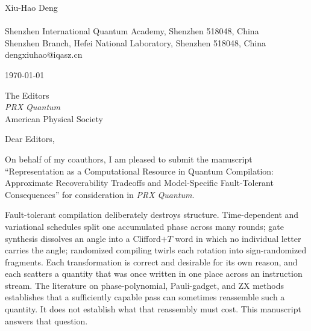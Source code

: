 \documentclass[11pt]{article}
\makeatletter
\newcommand{\AuthorName}{Xiu-Hao Deng}
\newcommand{\AuthorPosition}{}
\newcommand{\AuthorInstitutionA}{Shenzhen International Quantum Academy, Shenzhen 518048, China}
\newcommand{\AuthorInstitutionB}{Shenzhen Branch, Hefei National Laboratory, Shenzhen 518048, China}
\newcommand{\AuthorEmail}{dengxiuhao@iqasz.cn}
\newcommand{\LetterDate}{\today}
\newcommand{\PositionLine}{%
  \ifx\AuthorPosition\empty\else\AuthorPosition\\\fi}
\makeatother
\begin{document}
{\raggedright
\AuthorName\\
\PositionLine
\AuthorInstitutionA\\
\AuthorInstitutionB\\
\AuthorEmail\par}

\vspace{1.5\baselineskip}

\LetterDate

\vspace{1\baselineskip}

{\raggedright
The Editors\\
\textit{PRX Quantum}\\
American Physical Society\par}

\vspace{1.5\baselineskip}

Dear Editors,

On behalf of my coauthors, I am pleased to submit the manuscript
``Representation as a Computational Resource in Quantum Compilation:
Approximate Recoverability Tradeoffs and Model-Specific Fault-Tolerant
Consequences'' for consideration in \textit{PRX Quantum}.

Fault-tolerant compilation deliberately destroys structure. Time-dependent and
variational schedules split one accumulated phase across many rounds; gate
synthesis dissolves an angle into a Clifford$+T$ word in which no individual
letter carries the angle; randomized compiling twirls each rotation into
sign-randomized fragments. Each transformation is correct and desirable for its
own reason, and each scatters a quantity that was once written in one place
across an instruction stream. The literature on phase-polynomial, Pauli-gadget,
and ZX methods establishes that a sufficiently capable pass can sometimes
reassemble such a quantity. It does not establish what that reassembly must
cost. This manuscript answers that question.
\end{document}
